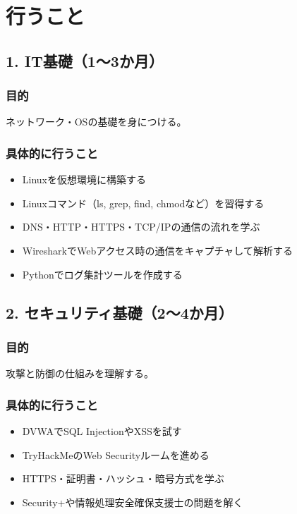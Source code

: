 \documentclass[a4paper,11pt,lualatex,ja=standard]{bxjsarticle}
\begin{document}
\newpage
\section{行うこと}

\subsection*{1. IT基礎（1〜3か月）}

\subsubsection*{目的}
ネットワーク・OSの基礎を身につける。

\subsubsection*{具体的に行うこと}

\begin{itemize}
    \item Linuxを仮想環境に構築する
    \item Linuxコマンド（ls, grep, find, chmodなど）を習得する
    \item DNS・HTTP・HTTPS・TCP/IPの通信の流れを学ぶ
    \item WiresharkでWebアクセス時の通信をキャプチャして解析する
    \item Pythonでログ集計ツールを作成する
\end{itemize}

\subsection*{2. セキュリティ基礎（2〜4か月）}

\subsubsection*{目的}
攻撃と防御の仕組みを理解する。

\subsubsection*{具体的に行うこと}

\begin{itemize}
    \item DVWAでSQL InjectionやXSSを試す
    \item TryHackMeのWeb Securityルームを進める
    \item HTTPS・証明書・ハッシュ・暗号方式を学ぶ
    \item Security+や情報処理安全確保支援士の問題を解く
\end{itemize}
\end{document}
